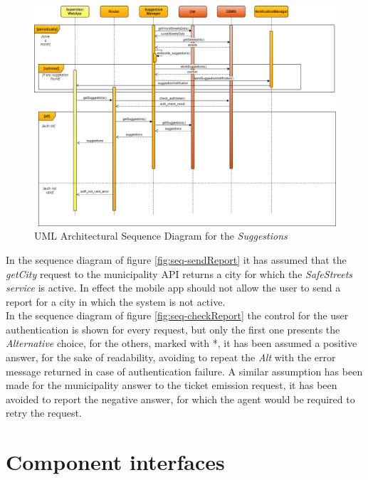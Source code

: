 \documentclass[a4paper]{report}
\begin{document}
\begin{landscape}

\begin{figure}[hp]
\includegraphics[angle=0, scale=0.65]{ArchSequenceSuggestions}
\caption{UML Architectural Sequence Diagram for the \textit{Suggestions}}
\label{fig:seq-suggestions}
\end{figure}

\end{landscape}
\restoregeometry

In the sequence diagram of figure \ref{fig:seq-sendReport} it has assumed that the \textit{getCity} request to the municipality API returns a city for which the \textit{SafeStreets service} is active. In effect the mobile app should not allow the user to send a report for a city in which the system is not active.\\
In the sequence diagram of figure \ref{fig:seq-checkReport} the control for the user authentication is shown for every request, but only the first one presents the \textit{Alternative} choice, for the others, marked with *, it has been assumed a positive answer, for the sake of readability, avoiding to repeat the \textit{Alt} with the error message returned in case of authentication failure. 
A similar assumption has been made for the municipality answer to the ticket emission request, it has been avoided to report the negative answer, for which the agent would be required to retry the request.

\section{Component interfaces}
\end{document}
